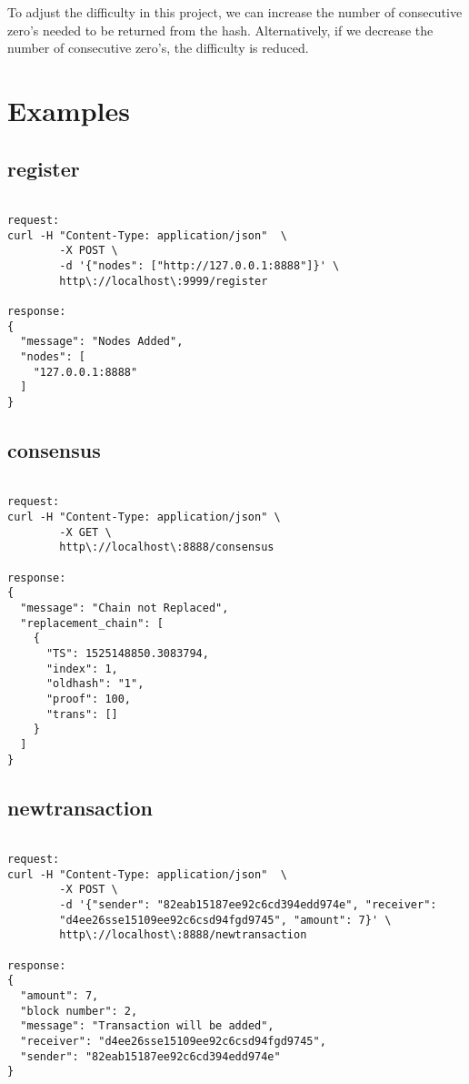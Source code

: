 To adjust the difficulty in this project, we can increase the number
of consecutive zero's needed to be returned from the
hash. Alternatively, if we decrease the number of consecutive zero's,
the difficulty is reduced.

\section{Examples}

\subsection{register}

\bigskip
\noindent
\begin{footnotesize}
\begin{verbatim}

request:
curl -H "Content-Type: application/json"  \
        -X POST \
        -d '{"nodes": ["http://127.0.0.1:8888"]}' \
        http\://localhost\:9999/register

response:
{
  "message": "Nodes Added",
  "nodes": [
    "127.0.0.1:8888"
  ]
}

\end{verbatim}
\end{footnotesize}

\subsection{consensus}

\bigskip
\noindent
\begin{footnotesize}
\begin{verbatim}

request:
curl -H "Content-Type: application/json" \
        -X GET \
        http\://localhost\:8888/consensus

response:
{
  "message": "Chain not Replaced",
  "replacement_chain": [
    {
      "TS": 1525148850.3083794,
      "index": 1,
      "oldhash": "1",
      "proof": 100,
      "trans": []
    }
  ]
}

\end{verbatim}
\end{footnotesize}

\subsection{newtransaction}

\bigskip
\noindent
\begin{footnotesize}
\begin{verbatim}

request:
curl -H "Content-Type: application/json"  \
        -X POST \
        -d '{"sender": "82eab15187ee92c6cd394edd974e", "receiver": 
        "d4ee26sse15109ee92c6csd94fgd9745", "amount": 7}' \
        http\://localhost\:8888/newtransaction

response:
{
  "amount": 7,
  "block number": 2,
  "message": "Transaction will be added",
  "receiver": "d4ee26sse15109ee92c6csd94fgd9745",
  "sender": "82eab15187ee92c6cd394edd974e"
}

\end{verbatim}
\end{footnotesize}

